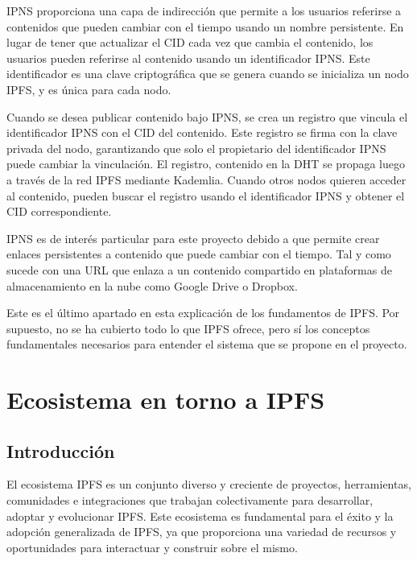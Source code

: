 IPNS proporciona una capa de indirección que permite a los usuarios referirse a contenidos que pueden cambiar con el tiempo usando un nombre persistente.
En lugar de tener que actualizar el CID cada vez que cambia el contenido, los usuarios pueden referirse al contenido usando un identificador IPNS.
Este identificador es una clave criptográfica que se genera cuando se inicializa un nodo IPFS, y es única para cada nodo.

Cuando se desea publicar contenido bajo IPNS, se crea un registro que vincula el identificador IPNS con el CID del contenido.
Este registro se firma con la clave privada del nodo, garantizando que solo el propietario del identificador IPNS puede cambiar la vinculación.
El registro, contenido en la DHT se propaga luego a través de la red IPFS mediante Kademlia. Cuando otros nodos quieren acceder al contenido, pueden buscar el registro usando el identificador IPNS y obtener el CID correspondiente.

IPNS es de interés particular para este proyecto debido a que permite crear enlaces persistentes a contenido que puede cambiar con el tiempo.
Tal y como sucede con una URL que enlaza a un contenido compartido en plataformas de almacenamiento en la nube como Google Drive o Dropbox.

Este es el último apartado en esta explicación de los fundamentos de IPFS. Por supuesto, no se ha cubierto todo lo que IPFS ofrece, pero sí los
conceptos fundamentales necesarios para entender el sistema que se propone en el proyecto.

\section{Ecosistema en torno a IPFS}\label{sect:ecosistema}
\subsection{Introducción}
El ecosistema IPFS es un conjunto diverso y creciente de proyectos, herramientas, comunidades e integraciones que trabajan colectivamente para desarrollar, adoptar y evolucionar IPFS. Este ecosistema es fundamental para el éxito y la adopción generalizada de IPFS, ya que proporciona una variedad de recursos y oportunidades para interactuar y construir sobre el mismo.

